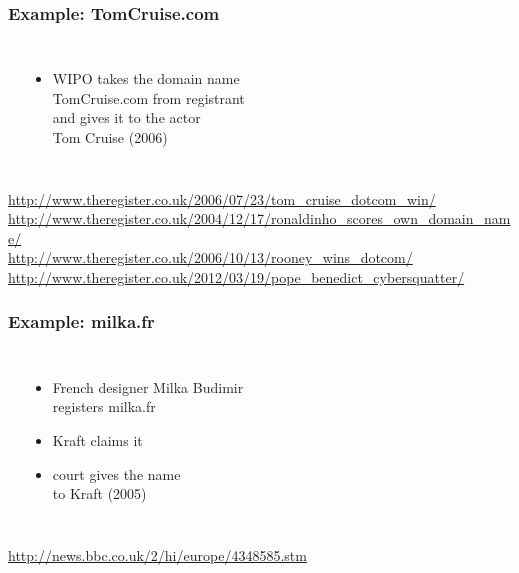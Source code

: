 \documentclass[dvipsnames]{beamer}
\theoremstyle{plain}
\begin{document}
\begin{frame}
  \frametitle{Example: TomCruise.com}

  \begin{columns}
    \begin{center}
    \end{center}

    \begin{itemize}
      \item WIPO takes the domain name\\
        TomCruise.com from registrant\\
        and gives it to the actor\\
        Tom Cruise (2006)
    \end{itemize}
  \end{columns}

  \medskip
  \tiny{\url{http://www.theregister.co.uk/2006/07/23/tom_cruise_dotcom_win/}}\\
  \tiny{\url{http://www.theregister.co.uk/2004/12/17/ronaldinho_scores_own_domain_name/}}\\
  \tiny{\url{http://www.theregister.co.uk/2006/10/13/rooney_wins_dotcom/}}\\
  \tiny{\url{http://www.theregister.co.uk/2012/03/19/pope_benedict_cybersquatter/}}\\
\end{frame}

\begin{frame}
  \frametitle{Example: milka.fr}

  \begin{columns}
    \begin{center}
    \end{center}

    \begin{itemize}
      \item French designer Milka Budimir\\
        registers milka.fr
      \item Kraft claims it
      \item court gives the name\\
        to Kraft (2005)
    \end{itemize}
  \end{columns}

  \medskip
  \tiny{\url{http://news.bbc.co.uk/2/hi/europe/4348585.stm}}\\
\end{frame}
\end{document}
